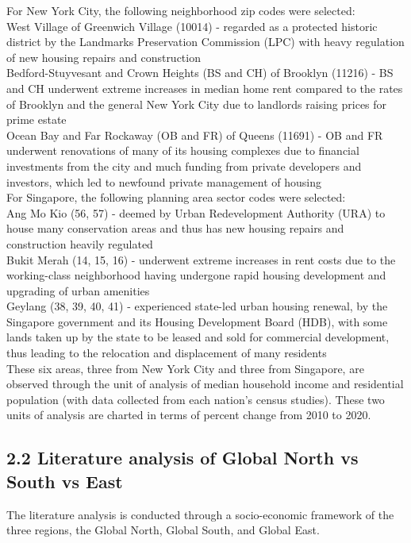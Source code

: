 \documentclass[12pt]{article}
\begin{document}
For New York City, the following neighborhood zip codes were selected:\\
West Village of Greenwich Village (10014) - regarded as a protected historic district by the Landmarks Preservation Commission (LPC) with heavy regulation of new housing repairs and construction \\
Bedford-Stuyvesant and Crown Heights (BS and CH) of Brooklyn (11216) - BS and CH underwent extreme increases in median home rent compared to the rates of Brooklyn and the general New York City due to landlords raising prices for prime estate \\
Ocean Bay and Far Rockaway (OB and FR) of Queens (11691) -  OB and FR underwent renovations of many of its housing complexes due to financial investments from the city and much funding from private developers and investors, which led to newfound private management of housing \\

For Singapore, the following planning area sector codes were selected: \\
Ang Mo Kio (56, 57) - deemed by Urban Redevelopment Authority (URA) to house many conservation areas and thus has new housing repairs and construction heavily regulated \\
Bukit Merah (14, 15, 16) - underwent extreme increases in rent costs due to the working-class neighborhood having undergone rapid housing development and upgrading of urban amenities \\
Geylang (38, 39, 40, 41) - experienced state-led urban housing renewal, by the Singapore government and its Housing Development Board (HDB), with some lands taken up by the state to be leased and sold for commercial development, thus leading to the relocation and displacement of many residents \\

These six areas, three from New York City and three from Singapore, are observed through the unit of analysis of median household income and residential population (with data collected from each nation’s census studies). These two units of analysis are charted in terms of percent change from 2010 to 2020. \\

\subsection*{2.2 Literature analysis of Global North vs South vs East} 
The literature analysis is conducted through a socio-economic framework of the three regions, the Global North, Global South, and Global East. \\
\end{document}
